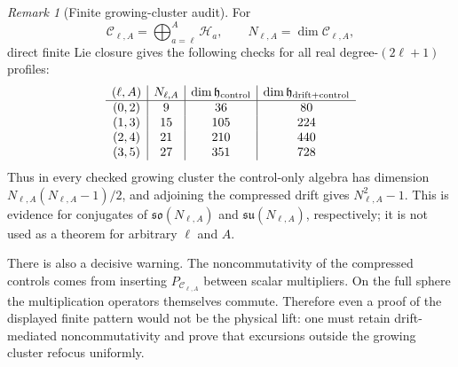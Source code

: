 \documentclass[11pt]{article}
\theoremstyle{remark}
\newtheorem{remark}[theorem]{Remark}
\begin{document}
\begin{remark}[Finite growing-cluster audit]
For
\[
 \mathcal C_{\ell,A}=\bigoplus_{a=\ell}^{A}\mathcal H_a,
 \qquad N_{\ell,A}=\dim\mathcal C_{\ell,A},
\]
direct finite Lie closure gives the following checks for all real
degree-$(2\ell+1)$ profiles:
\[
\begin{array}{c|c|c|c}
(\ell,A)&N_{\ell,A}&\dim\mathfrak h_{\rm control}
&\dim\mathfrak h_{\rm drift+control}\\ \hline
(0,2)&9&36&80\\
(1,3)&15&105&224\\
(2,4)&21&210&440\\
(3,5)&27&351&728
\end{array}
\]
Thus in every checked growing cluster the control-only algebra has dimension
$N_{\ell,A}(N_{\ell,A}-1)/2$, and adjoining the compressed drift gives
$N_{\ell,A}^2-1$.  This is evidence for conjugates of
$\mathfrak{so}(N_{\ell,A})$ and $\mathfrak{su}(N_{\ell,A})$, respectively;
it is not used as a theorem for arbitrary $\ell$ and $A$.

There is also a decisive warning.  The noncommutativity of the compressed
controls comes from inserting $P_{\mathcal C_{\ell,A}}$ between scalar
multipliers.  On the full sphere the multiplication operators themselves
commute.  Therefore even a proof of the displayed finite pattern would not
be the physical lift: one must retain drift-mediated noncommutativity and
prove that excursions outside the growing cluster refocus uniformly.
\end{remark}
\end{document}
